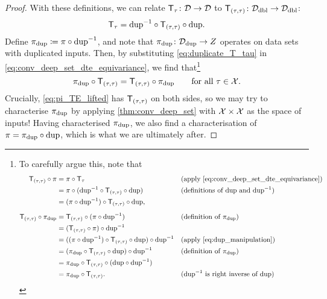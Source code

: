 \documentclass[12pt, twoside]{report}
\begin{document}
\begin{proof}
With these definitions, we can relate $\T_\tau\colon \D \to \D$ to $\T_{(\tau, \tau)}\colon \D\ss{dbl} \to \D\ss{dbl}$:
\begin{equation} \label{eq:duplicate_T_tau}
    \T_\tau = \dedup \comp \T_{(\tau, \tau)} \comp \dup.
\end{equation}
Define $\pi\ss{dup} \coloneqq \pi \comp \dedup$,
and note that $\pi\ss{dup}\colon \D\ss{dup} \to Z$ operates on data sets with duplicated inputs.
Then, by substituting \eqref{eq:duplicate_T_tau} in \eqref{eq:conv_deep_set_dte_equivariance}, we find that\footnote{\setlength{\jot}{0pt}
To carefully argue this, note that
\begin{align}
    \T_{(\tau, \tau)} \comp \pi
    &= \pi \comp \T_{\tau}
        &&\text{(apply \eqref{eq:conv_deep_set_dte_equivariance})} \\
    &= \pi \comp (\dedup \comp \T_{(\tau, \tau)} \comp \dup)
        &&\text{(definitions of $\dup$ and $\dedup$)}\\
        &= (\pi \comp \dedup) \comp \T_{(\tau, \tau)} \comp \dup, \label{eq:dup_manipulation} \\[.5em]
    \T_{(\tau, \tau)} \comp \pi\ss{dup}
    &= \T_{(\tau, \tau)} \comp (\pi \comp \dedup)
        &&\text{(definition of $\pi\ss{dup}$)} \\
    &= (\T_{(\tau, \tau)} \comp \pi) \comp \dedup \\
    &= ((\pi \comp \dedup) \comp \T_{(\tau, \tau)} \comp \dup) \comp \dedup
        &&\text{(apply \eqref{eq:dup_manipulation})} \\
    &= (\pi\ss{dup} \comp \T_{(\tau, \tau)} \comp \dup) \comp \dedup
        &&\text{(definition of $\pi\ss{dup}$)} \\
    &= \pi\ss{dup} \comp \T_{(\tau, \tau)} \comp (\dup \comp \dedup) \\
    &= \pi\ss{dup} \comp \T_{(\tau, \tau)}.
        &&\text{($\dedup$ is right inverse of $\dup$)}
\end{align}
}
\begin{equation} \label{eq:pi_TE_lifted}
    \pi\ss{dup} \comp \T_{(\tau, \tau)} = \T_{(\tau, \tau)} \comp \pi\ss{dup}
    \qquad \text{for all $\tau \in \X$.}
\end{equation}
Crucially, \eqref{eq:pi_TE_lifted} has $\T_{(\tau,\tau)}$ on both sides, so we may try to characterise $\pi\ss{dup}$ by applying \cref{thm:conv_deep_set} with $\mathcal{X} \times \mathcal{X}$ as the space of inputs!
Having characterised $\pi\ss{dup}$, we also find a characterisation of $\pi = \pi\ss{dup} \comp \dup$, which is what we are ultimately after.

\end{proof}
\end{document}
